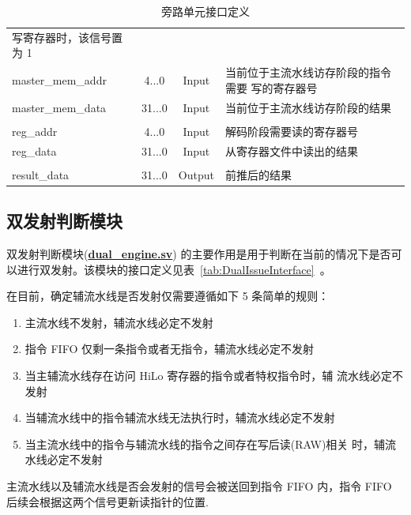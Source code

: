 \documentclass[blue,normal,cn,hide]{elegantbook}
\begin{document}
\begin{table}
\begin{tabular}{lccm{}}
        写寄存器时，该信号置为 1 \\
        master\_mem\_addr & 4...0 & Input & 当前位于主流水线访存阶段的指令需要
        写的寄存器号 \\
        master\_mem\_data & 31...0 & Input & 当前位于主流水线访存阶段的结果 \\
        \\
        reg\_addr & 4...0 & Input & 解码阶段需要读的寄存器号 \\
        reg\_data & 31...0 & Input & 从寄存器文件中读出的结果 \\
        \\
        result\_data & 31...0 & Output & 前推后的结果 \\
        \bottomrule
    \end{tabular}
    \caption{旁路单元接口定义}
    \label{tab:ForwardingUnitInterface}
\end{table}

\subsection{双发射判断模块}

双发射判断模块(\href{https://github.com/name1e5s/Sirius/blob/master/dual\_engine.sv}{\textbf{dual\_engine.sv}})
的主要作用是用于判断在当前的情况下是否可以进行双发射。该模块的接口定义见表~\ref{tab:DualIssueInterface}~。

在目前，确定辅流水线是否发射仅需要遵循如下 5 条简单的规则：
\begin{enumerate}
    \item 主流水线不发射，辅流水线必定不发射
    \item 指令 FIFO 仅剩一条指令或者无指令，辅流水线必定不发射
    \item 当主辅流水线存在访问 HiLo 寄存器的指令或者特权指令时，辅
    流水线必定不发射
    \item 当辅流水线中的指令辅流水线无法执行时，辅流水线必定不发射
    \item 当主流水线中的指令与辅流水线的指令之间存在写后读(RAW)相关
    时，辅流水线必定不发射
\end{enumerate}

主流水线以及辅流水线是否会发射的信号会被送回到指令 FIFO 内，指令 FIFO
后续会根据这两个信号更新读指针的位置.
\end{document}
